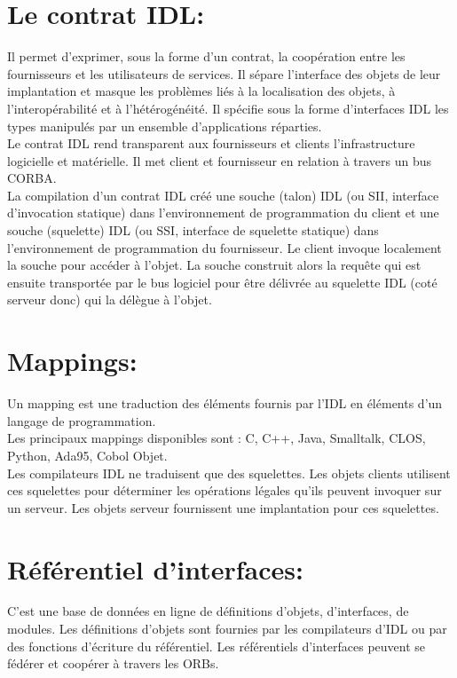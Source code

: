 \section{Le contrat IDL:}
Il permet d'exprimer, sous la forme d'un contrat, la coopération entre les fournisseurs et les utilisateurs de services. Il sépare l'interface des objets de leur implantation et masque les problèmes liés à la localisation des objets, à l'interopérabilité et à l'hétérogénéité. Il spécifie sous la forme d'interfaces IDL les types manipulés par un ensemble d'applications réparties.\\
Le contrat IDL rend transparent aux fournisseurs et clients l'infrastructure logicielle et matérielle. Il met client et fournisseur en relation à travers un bus CORBA.\\
La compilation d'un contrat IDL créé une souche (talon) IDL (ou SII, interface d'invocation statique) dans l'environnement de programmation du client et une souche (squelette) IDL (ou SSI, interface de squelette statique) dans l'environnement de programmation du fournisseur.
Le client invoque localement la souche pour accéder à l'objet. La souche construit alors la requête qui est ensuite transportée par le bus logiciel pour être délivrée au squelette IDL (coté serveur donc) qui la délègue à l'objet.\\

\section{Mappings:}
Un mapping est une traduction des éléments fournis par l'IDL en éléments d'un langage de programmation.\\
Les principaux mappings disponibles sont : C, C++, Java, Smalltalk, CLOS, Python, Ada95, Cobol Objet.\\
Les compilateurs IDL ne traduisent que des squelettes. Les objets clients utilisent ces squelettes pour déterminer les opérations légales qu'ils peuvent invoquer sur un serveur. Les objets serveur fournissent une implantation pour ces squelettes.

\section{Référentiel d'interfaces:}
C'est une base de données en ligne de définitions d'objets, d'interfaces, de modules. Les définitions d'objets sont fournies par les compilateurs d'IDL ou par des fonctions d'écriture du référentiel.
Les référentiels d'interfaces peuvent se fédérer et coopérer à travers les ORBs.

